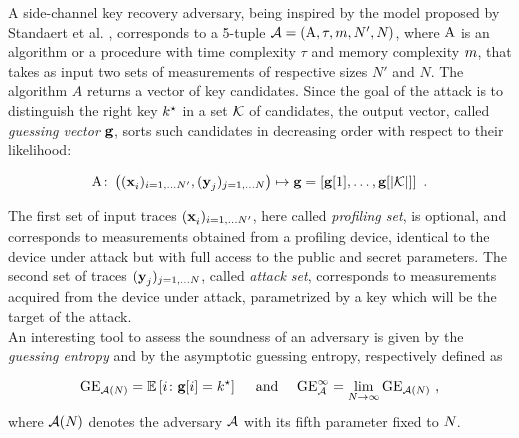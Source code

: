 A side-channel key recovery adversary, being inspired by the model proposed by Standaert et al. \cite{unifiedFramework}, corresponds to a 5-tuple  $\adversary = (\attackAlgorithm, \tau, \memComplexity , \numTraces[]', \numTraces[])$, where $\attackAlgorithm$ is an algorithm or a procedure with time complexity $\tau$ and memory complexity $\memComplexity$, that takes as input two sets of measurements of respective sizes $N'$ and $N$. The algorithm $A$ returns a vector of key candidates. Since the goal of the attack is to distinguish the right key $\keyTest$ in a set  $\keySet$  of candidates, the output vector, called {\em guessing vector} $\guessingVector$, sorts such candidates in decreasing order with respect to their likelihood:

\begin{equation}
\attackAlgorithm \colon \left( (\sss[]{i})_{i=1,\dots \numTraces[]'}, (\sssTest[]{j})_{j=1,\dots \numTraces[]} \right) \mapsto \guessingVector = \left[\guessingVector[1], \dots, \guessingVector[{\lvert \keySet \rvert}]\right] \mbox{ .}
\end{equation}


The first set of input traces $(\sss[]{i})_{i=1,\dots \numTraces[]'}$, here called {\em profiling set}, is optional, and corresponds to measurements obtained from a profiling device, identical to the device under attack but with full access to the public and secret parameters. The second set of traces $(\sssTest[]{j})_{j=1,\dots \numTraces[]}$,  called {\em attack set}, corresponds to measurements acquired from the device under attack, parametrized by a key which will be the target of the attack.\\

An interesting tool to assess the soundness of an adversary is given by the {\em guessing entropy} \cite{massey1994guessing} and by the {asymptotic guessing entropy}, respectively defined as

\begin{equation}
\guessingEntropy_{\adversary(\numTraces[])}  = \mathbb{E}\left[i \colon \guessingVector[i] = \keyTest \right] \quad \mbox{ and } \quad \guessingEntropy^\infty_\adversary  = \lim_{\numTraces[]\rightarrow \infty} \guessingEntropy_{\adversary(\numTraces[])} \mbox{ ,}
\end{equation}
where $\adversary(\numTraces[])$ denotes the adversary $\adversary$ with its fifth parameter fixed to $\numTraces[]$.\\

